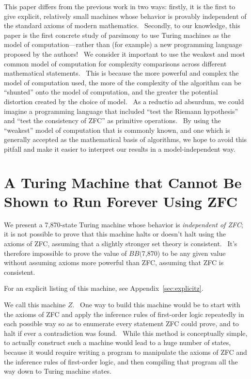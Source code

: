 \documentclass[11pt]{article}
\newcommand{\statenumstate}{7,870-state }
\newcommand{\bbstatenum}{$BB($7,870) }
\begin{document}
This paper differs from the previous work in two ways: firstly, it is the first to give explicit, relatively small machines whose behavior is provably independent of the standard axioms of modern mathematics. \ Secondly, to our knowledge, this paper is the first concrete study of parsimony to use Turing machines as the model of computation---rather than (for example) a new programming language proposed by the authors! \ We consider it important to use the weakest and most common model of computation for complexity comparisons across different mathematical statements. \ This is because the more powerful and complex the model of computation used, the more of the complexity of the algorithm can be ``shunted'' onto the model of computation, and the greater the potential distortion created by the choice of model. \ As a reductio ad absurdum, we could imagine a programming language that included ``test the Riemann hypothesis'' and ``test the consistency of ZFC'' as primitive operations. \ By using the ``weakest'' model of computation that is commonly known, and one which is generally accepted as the mathematical basis of algorithms, we hope to avoid this pitfall and make it easier to interpret our results in a model-independent way.

\section{A Turing Machine that Cannot Be Shown to Run Forever Using ZFC}

We present a \statenumstate Turing machine whose behavior is \emph{independent of ZFC}; it is not possible to prove that this machine halts or doesn't halt using the axioms of ZFC, assuming that a slightly stronger set theory is consistent. \ It's therefore impossible to prove the value of \bbstatenum to be any given value without assuming axioms more powerful than ZFC, assuming that ZFC is consistent.

For an explicit listing of this machine, see Appendix~\ref{sec:explicitz}.

We call this machine $Z$. \ One way to build this machine would be to start with the axioms of ZFC and apply the inference rules of first-order logic repeatedly in each possible way so as to enumerate every statement ZFC could prove, and to halt if ever a contradiction was found. \ While this method is conceptually simple, to actually construct such a machine would lead to a huge number of states, because it would require writing a program to manipulate the axioms of ZFC and the inference rules of first-order logic, and then compiling that program all the way down to Turing machine states.
\end{document}
